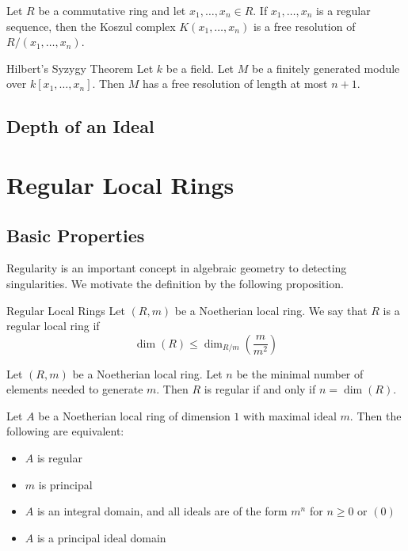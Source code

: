 \documentclass[a4paper]{article}
\begin{document}
\begin{thm}{}{} Let $R$ be a commutative ring and let $x_1,\dots,x_n\in R$. If $x_1,\dots,x_n$ is a regular sequence, then the Koszul complex $K(x_1,\dots,x_n)$ is a free resolution of $R/(x_1,\dots,x_n)$. 
\end{thm}

\begin{thm}{Hilbert's Syzygy Theorem}{} Let $k$ be a field. Let $M$ be a finitely generated module over $k[x_1,\dots,x_n]$. Then $M$ has a free resolution of length at most $n+1$. 
\end{thm}

\subsection{Depth of an Ideal}

\pagebreak
\section{Regular Local Rings}
\subsection{Basic Properties}
Regularity is an important concept in algebraic geometry to detecting singularities. We motivate the definition by the following proposition. 

\begin{defn}{Regular Local Rings}{} Let $(R,m)$ be a Noetherian local ring. We say that $R$ is a regular local ring if $$\dim(R)\leq\dim_{R/m}\left(\frac{m}{m^2}\right)$$
\end{defn}

\begin{lmm}{}{} Let $(R,m)$ be a Noetherian local ring. Let $n$ be the minimal number of elements needed to generate $m$. Then $R$ is regular if and only if $n=\dim(R)$. 
\end{lmm}

\begin{thm}{}{} Let $A$ be a Noetherian local ring of dimension $1$ with maximal ideal $m$. Then the following are equivalent: 
\begin{itemize}
\item $A$ is regular
\item $m$ is principal
\item $A$ is an integral domain, and all ideals are of the form $m^n$ for $n\geq 0$ or $(0)$
\item $A$ is a principal ideal domain
\end{itemize}
\end{thm}
\end{document}
